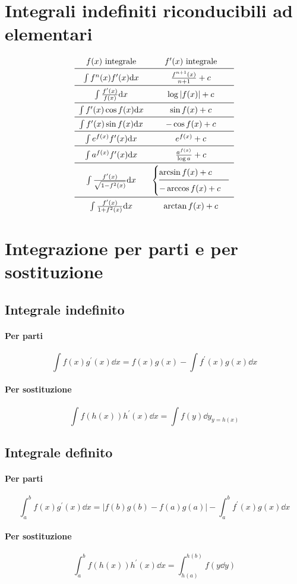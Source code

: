 \section{Integrali indefiniti riconducibili ad elementari}
\begin{equation}
\begin{array}{ c c }
f(x) \text{ integrale} &f^\prime(x) \text{ integrale} \\ \midrule
\int f^n(x)f^\prime(x)\dd x & \frac{f^{n+1}(x)}{n+1}+c \\ \midrule
\int\frac{f^\prime(x)}{f(x)}\dd x & \log|f(x)|+c \\ \midrule
\int f^\prime(x)\cos f(x)\dd x & \sin f(x)+c \\ \midrule
\int f^\prime(x)\sin f(x)\dd x & -\cos f(x)+c \\ \midrule
\int e^{f(x)}f^\prime(x)\dd x & e^{f(x)}+c \\ \midrule
\int a^{f(x)}f^\prime(x)\dd x & \frac{a^{f(x)}}{\log a}+c \\ \midrule
\int\frac{f^\prime(x)}{\sqrt{1-f^2(x)}}\dd x & \begin{cases}\arcsin f(x)+c\\ \midrule-\arccos f(x)+c\end{cases} \\ \midrule
\int\frac{f^\prime(x)}{1+f^2(x)}\dd x & \arctan f(x)+c \\
\end{array}
\end{equation}

\section{Integrazione per parti e per sostituzione}
\subsection{Integrale indefinito}
\paragraph{Per parti}
\[\int f(x)g^\prime(x)\dd x=f(x)g(x)-\int f^\prime(x)g(x)\dd x\]
\paragraph{Per sostituzione}
\[\int f(h(x))h^\prime(x)\dd x=\int f(y)\dd y_{y=h(x)}\]
\subsection{Integrale definito}
\paragraph{Per parti}
\[\int_a^b f(x)g^\prime(x)\dd x=|f(b)g(b)-f(a)g(a)|-\int_a^b f^\prime(x)g(x)\dd x\]
\paragraph{Per sostituzione}
\[\int_a^b f(h(x))h^\prime(x)\dd x=\int_{h(a)}^{h(b)}f(y\dd y)\]